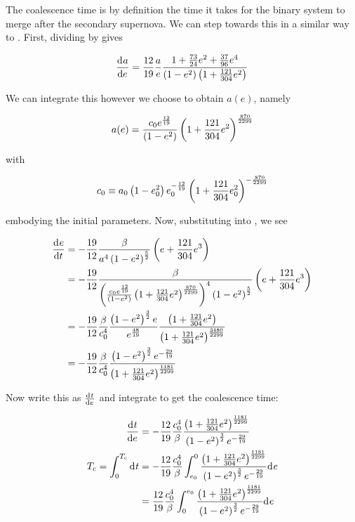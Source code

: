 The coalescence time is by definition the time it takes for the binary system to merge after the secondary supernova. We can step towards this in a similar way to \citet{Peters:1964}. First, dividing  by  gives

\begin{equation}
    \dv{a}{e} = \frac{12}{19}\frac{a}{e}\frac{1+\frac{73}{24}e^2+\frac{37}{96}e^4}{\pqty{1-e^2}\pqty{1+\frac{121}{304}e^2}}
\end{equation}

We can integrate this however we choose to obtain $a(e)$, namely

\begin{equation}
    a(e) = \frac{c_0 e^\frac{12}{19}}{\left(1-e^2\right)}\left(1+\frac{121}{304}e^2\right)^\frac{870}{2299}
    \label{eq:a_functionof_e}
\end{equation}

with

\begin{equation}
    c_0 \equiv a_0\left(1-e_0^2\right)e_0^{-\frac{12}{19}}\left(1+\frac{121}{304}e_0^2\right)^{-\frac{870}{2299}}
    \label{eq:singularity_in_c0_oh_noes}
\end{equation}

embodying the initial parameters. Now, substituting  into , we see

\begin{align}
    \dv{e}{t} &= -\frac{19}{12}\frac{\beta}{a^4\pqty{1-e^2}^\frac52}\pqty{e+\frac{121}{304}e^3} \\
    &= -\frac{19}{12}\frac{\beta}{\pqty{\frac{c_0 e^\frac{12}{19}}{\pqty{1-e^2}}\pqty{1+\frac{121}{304}e^2}^\frac{870}{2299}}^4\pqty{1-e^2}^\frac52}\pqty{e+\frac{121}{304}e^3} \\
    &= -\frac{19}{12}\frac{\beta}{c_0^4}\frac{\pqty{1-e^2}^\frac{3}{2} e}{e^\frac{48}{19}}\frac{\pqty{1+\frac{121}{304}e^2}}{\pqty{1+\frac{121}{304}e^2}^\frac{3480}{2299}} \\
    &= -\frac{19}{12}\frac{\beta}{c_0^4}\frac{\pqty{1-e^2}^\frac{3}{2} e^{-\frac{29}{19}}}{\pqty{1+\frac{121}{304}e^2}^\frac{1181}{2299}} \\
\end{align}

Now write this as $\dv{t}{e}$ and integrate to get the coalescence time:

\begin{align}
    \dv{t}{e} &= -\frac{12}{19}\frac{c_0^4}{\beta}\frac{\pqty{1+\frac{121}{304}e^2}^\frac{1181}{2299}}{\pqty{1-e^2}^\frac{3}{2} e^{-\frac{29}{19}}} \\
    T_\text{c} = \int_0^{T_\text{c}} \dd{t} &= -\frac{12}{19}\frac{c_0^4}{\beta}\int_{e_0}^0\frac{\pqty{1+\frac{121}{304}e^2}^\frac{1181}{2299}}{\pqty{1-e^2}^\frac{3}{2} e^{-\frac{29}{19}}} \dd{e} \\
    &= \frac{12}{19}\frac{c_0^4}{\beta}\int_0^{e_0}\frac{\pqty{1+\frac{121}{304}e^2}^\frac{1181}{2299}}{\pqty{1-e^2}^\frac{3}{2} e^{-\frac{29}{19}}} \dd{e}
\end{align}

